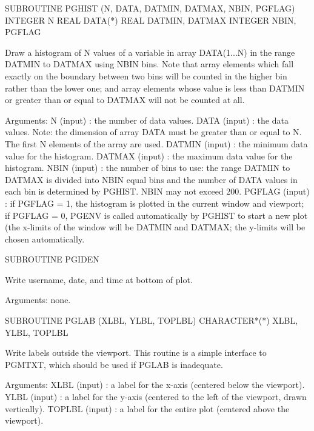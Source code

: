 {\eightpoint\begintt
      SUBROUTINE PGHIST (N, DATA, DATMIN, DATMAX, NBIN, PGFLAG)
      INTEGER N
      REAL    DATA(*)
      REAL    DATMIN, DATMAX
      INTEGER NBIN, PGFLAG
 
Draw a histogram of N values of a variable in array
DATA(1...N) in the range DATMIN to DATMAX using NBIN bins.  Note
that array elements which fall exactly on the boundary between
two bins will be counted in the higher bin rather than the
lower one; and array elements whose value is less than DATMIN or
greater than or equal to DATMAX will not be counted at all.
 
Arguments:
 N      (input)  : the number of data values.
 DATA   (input)  : the data values. Note: the dimension of array
                   DATA must be greater than or equal to N. The
                   first N elements of the array are used.
 DATMIN (input)  : the minimum data value for the histogram.
 DATMAX (input)  : the maximum data value for the histogram.
 NBIN   (input)  : the number of bins to use: the range DATMIN to
                   DATMAX is divided into NBIN equal bins and
                   the number of DATA values in each bin is
                   determined by PGHIST.  NBIN may not exceed 200.
 PGFLAG (input)  : if PGFLAG = 1, the histogram is plotted in the
                   current window and viewport; if PGFLAG = 0,
                   PGENV is called automatically by PGHIST to start
                   a new plot (the x-limits of the window will be
                   DATMIN and DATMAX; the y-limits will be chosen
                   automatically.
\endtt}

{\eightpoint\begintt
      SUBROUTINE PGIDEN
 
Write username, date, and time at bottom of plot.
 
Arguments: none.
\endtt}

{\eightpoint\begintt
      SUBROUTINE PGLAB (XLBL, YLBL, TOPLBL)
      CHARACTER*(*) XLBL, YLBL, TOPLBL
 
Write labels outside the viewport. This routine is a simple
interface to PGMTXT, which should be used if PGLAB is inadequate.
 
Arguments:
 XLBL   (input) : a label for the x-axis (centered below the
                  viewport).
 YLBL   (input) : a label for the y-axis (centered to the left
                  of the viewport, drawn vertically).
 TOPLBL (input) : a label for the entire plot (centered above the
                  viewport).
\endtt}

